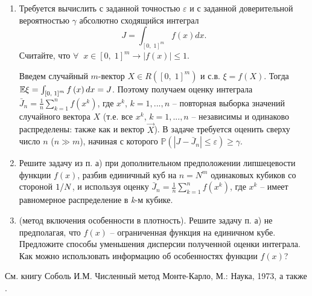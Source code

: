 \begin{problem}
\begin{enumerate}
\item Требуется вычислить с заданной точностью $\varepsilon $ и с заданной доверительной вероятностью $\gamma $ абсолютно сходящийся интеграл 
\[
J=\int _{\left[0,\; 1\right]^{m} }f\left({x}\right)d{x}.
\] Считайте, что $\forall \; \; {x}\in \left[0,\; 1\right]^{m} \to \left|f\left({x}\right)\right|\le 1$.

\begin{remark}
Введем случайный $m$-вектор ${X}\in R\left(\left[0,\; 1\right]^{m} \right)$ и с.в. $\xi =f\left({X}\right)$. Тогда $\mathrm{{\mathbb E}}\xi =\int _{\left[0,\; 1\right]^{m} }f\left({x}\right)d{x} =J$. Поэтому получаем оценку интеграла $\bar{J}_{n} =\frac{1}{n} \sum _{k=1}^{n}f\left({x}^{k} \right) $, где ${x}^{k} $, $k=1,...,n$ -- повторная выборка значений случайного вектора ${X}$ (т.е. все ${x}^{k} $, $k=1,...,n$ -- независимы и одинаково распределены: также как и вектор $\vec{X}$). В задаче требуется оценить сверху число $n$ ($n\gg m$), начиная с которого $\mathbb{P}\left(\left|J-\bar{J}_{n} \right|\le \varepsilon \right)\ge \gamma $.
\end{remark}



\item Решите задачу из п. а) при дополнительном предположении липшецевости функции $f\left({x}\right)$, разбив единичный куб на $n=N^{m} $ одинаковых кубиков со стороной ${1\mathord{\left/ {\vphantom {1 N}} \right. \kern-\nulldelimiterspace} N} $, и используя оценку $\bar{J}_{n} =\frac{1}{n} \sum _{k=1}^{n}f\left({x}^{k} \right) $, где ${x}^{k} $ -- имеет равномерное распределение в \textit{k}-м кубике.

\item (метод включения особенности в плотность). Решите задачу п. а) не предполагая, что $f\left({x}\right)$ -- ограниченная функция на единичном кубе. Предложите способы уменьшения дисперсии полученной оценки интеграла. Как можно использовать информацию об особенностях функции $f\left({x}\right)$?

\end{enumerate}

\end{problem}
\begin{ordre}
См. книгу Соболь И.М. Численный метод Монте-Карло, М.: Наука, 1973, а также \cite{lagutin}.
\end{ordre}


